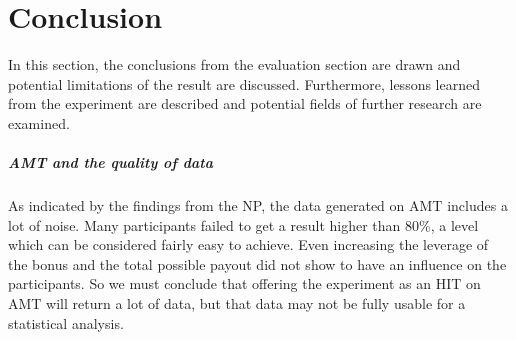
\chapter{Conclusion}
\label{ch:Conclusion}

In this section, the conclusions from the evaluation section are drawn and potential limitations of the result are discussed. Furthermore, lessons learned from the experiment are described and potential fields of further research are examined.

\paragraph{\acf{AMT} and the quality of data}
As indicated by the findings from the \acl{NP}, the data generated on \ac{AMT} includes a lot of noise. Many participants failed to get a result higher than 80\%, a level which can be considered fairly easy to achieve. Even increasing the leverage of the bonus and the total possible payout did not show to have an influence on the participants. So we must conclude that offering the experiment as an \ac{HIT} on \ac{AMT} will return a lot of data, but that data may not be fully usable for a statistical analysis. 

